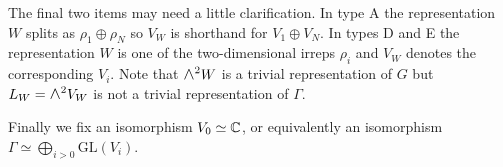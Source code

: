 \documentclass{amsart}
\theoremstyle{definition}
\newcommand\pgap{\vspace{10pt}}
\newcommand{\Wedge}{\mbox{\scalebox{1.2}{$\wedge$}}}
\newcommand\VW{V_W}
\begin{document}
The final two items may need a little clarification. In type A the representation $W$ splits as $\rho_1\oplus \rho_N$ so $V_W$ is shorthand for $V_1\oplus V_N$. In types D and E the representation $W$ is one of the two-dimensional irreps $\rho_i$ and $V_W$ denotes the corresponding $V_i$.  Note that $\Wedge^2 W$ is a trivial representation of $G$ but $L_W=\Wedge^2\VW$ is not a trivial representation of $\Gamma$. 
\pgap

Finally we fix an isomorphism  $V_0\simeq \mathbb{C}$, or equivalently an isomorphism $\Gamma\simeq \bigoplus_{i>0} \text{GL}(V_i)$.


\end{document}
